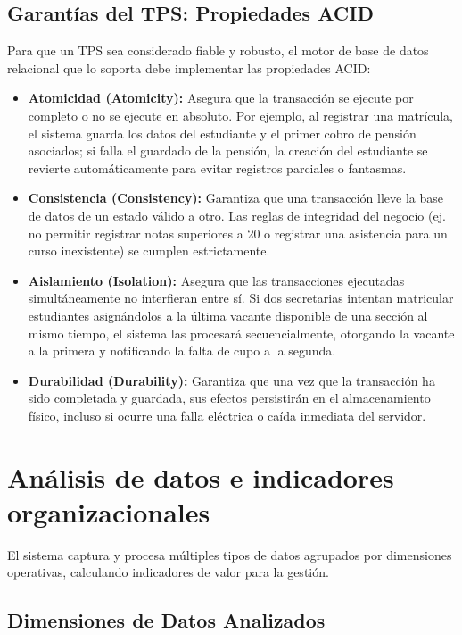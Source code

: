 \documentclass[12pt,a4paper,oneside]{report}
\begin{document}
\subsection{Garantías del TPS: Propiedades ACID}
Para que un TPS sea considerado fiable y robusto, el motor de base de datos relacional que lo soporta debe implementar las propiedades ACID:
\begin{itemize}
    \item \textbf{Atomicidad (Atomicity):} Asegura que la transacción se ejecute por completo o no se ejecute en absoluto. Por ejemplo, al registrar una matrícula, el sistema guarda los datos del estudiante y el primer cobro de pensión asociados; si falla el guardado de la pensión, la creación del estudiante se revierte automáticamente para evitar registros parciales o fantasmas.
    \item \textbf{Consistencia (Consistency):} Garantiza que una transacción lleve la base de datos de un estado válido a otro. Las reglas de integridad del negocio (ej. no permitir registrar notas superiores a 20 o registrar una asistencia para un curso inexistente) se cumplen estrictamente.
    \item \textbf{Aislamiento (Isolation):} Asegura que las transacciones ejecutadas simultáneamente no interfieran entre sí. Si dos secretarias intentan matricular estudiantes asignándolos a la última vacante disponible de una sección al mismo tiempo, el sistema las procesará secuencialmente, otorgando la vacante a la primera y notificando la falta de cupo a la segunda.
    \item \textbf{Durabilidad (Durability):} Garantiza que una vez que la transacción ha sido completada y guardada, sus efectos persistirán en el almacenamiento físico, incluso si ocurre una falla eléctrica o caída inmediata del servidor.
\end{itemize}

\section{Análisis de datos e indicadores organizacionales}

El sistema captura y procesa múltiples tipos de datos agrupados por dimensiones operativas, calculando indicadores de valor para la gestión.

\subsection{Dimensiones de Datos Analizados}
\end{document}
